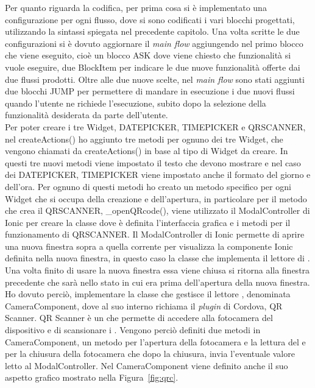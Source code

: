 Per quanto riguarda la codifica, per prima cosa si è implementato una configurazione  per ogni flusso, dove si sono codificati i vari blocchi progettati, utilizzando la sintassi spiegata nel precedente capitolo. Una volta scritte le due configurazioni si è dovuto aggiornare il \emph{main flow} aggiungendo nel primo blocco che viene eseguito, cioè un blocco ASK dove viene chiesto che funzionalità si vuole eseguire, due BlockItem per indicare le due nuove funzionalità offerte dai due flussi prodotti. Oltre alle due nuove scelte, nel \emph{main flow} sono stati aggiunti due blocchi JUMP per permettere di mandare in esecuzione i due nuovi flussi quando l'utente ne richiede l'esecuzione, subito dopo la selezione della funzionalità desiderata da parte dell'utente.\\

Per poter creare i tre Widget, DATEPICKER, TIMEPICKER e QRSCANNER, nel createActions() ho aggiunto tre metodi per ognuno dei tre Widget, che vengono chiamati da createActions() in base al tipo di Widget da creare. In questi tre nuovi metodi viene impostato il testo che devono mostrare e nel caso dei DATEPICKER, TIMEPICKER viene impostato anche il formato del giorno e dell'ora. Per ognuno di questi metodi ho creato un metodo specifico per ogni Widget che si occupa della creazione e dell'apertura, in particolare per il metodo che crea il QRSCANNER, \_openQRcode(), viene utilizzato il ModalController di Ionic per creare la classe dove è definita l'interfaccia grafica e i metodi per il funzionamento di QRSCANNER. Il ModalController di Ionic permette di aprire una nuova finestra sopra a quella corrente per visualizza la componente Ionic definita nella nuova finestra, in questo caso la classe che implementa il lettore di . Una volta finito di usare la nuova finestra essa viene chiusa si ritorna alla finestra precedente che sarà nello stato in cui era prima dell'apertura della nuova finestra. Ho dovuto perciò, implementare la classe che gestisce il lettore , denominata CameraComponent, dove al suo interno richiama il \emph{plugin} di Cordova, QR Scanner. QR Scanner è un  che permette di accedere alla fotocamera del dispositivo e di scansionare i . Vengono perciò definiti due metodi in CameraComponent, un metodo per l'apertura della fotocamera e la lettura del  e per la chiusura della fotocamera che dopo la chiusura, invia l'eventuale valore letto al ModalController. Nel CameraComponent viene definito anche il suo aspetto grafico mostrato nella Figura~\ref{fig:qrc}.\\
 
